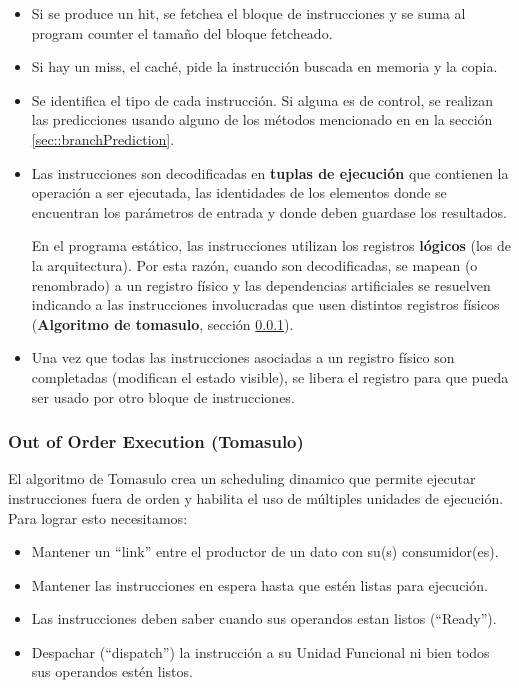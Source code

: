 \begin{itemize}
	\item Si se produce un hit, se fetchea el bloque de instrucciones y se suma al program counter el tamaño del bloque fetcheado.
	\item Si hay un miss, el caché, pide la instrucción buscada en memoria y la copia.
	\item Se identifica el tipo de cada instrucción. Si alguna es de control, se realizan las predicciones usando alguno de los métodos mencionado en en la sección \ref{sec::branchPrediction}.
	\item Las instrucciones son decodificadas en  \textbf{tuplas de ejecución} que contienen la operación a ser ejecutada, las identidades de los elementos donde se encuentran los parámetros de entrada y donde deben guardase los resultados. 
	
	En el programa estático, las instrucciones utilizan los registros \textbf{lógicos} (los de la arquitectura). Por esta razón, cuando son decodificadas, se mapean (o renombrado) a un registro físico y las dependencias artificiales se resuelven indicando a las instrucciones involucradas que usen distintos registros físicos (\textbf{Algoritmo de tomasulo}, sección \ref{ilp::tomasulo}).

	\item Una vez que todas las instrucciones asociadas a un registro físico son completadas (modifican el estado visible), se libera el registro para que pueda ser usado por otro bloque de instrucciones. 		
\end{itemize}


\subsubsection{Out of Order Execution (Tomasulo)}\label{ilp::tomasulo}
El algoritmo de Tomasulo crea un scheduling dinamico que permite ejecutar instrucciones fuera de orden y habilita el uso de múltiples unidades de ejecución. Para lograr esto necesitamos:
\begin{itemize}
	\item Mantener un ``link'' entre el productor de un dato con su(s) consumidor(es).
	\item Mantener las instrucciones en espera hasta que estén listas para ejecución.
	\item Las instrucciones deben saber cuando sus operandos estan listos (``Ready'').
	\item Despachar (``dispatch'') la instrucción a su Unidad Funcional ni bien todos sus operandos estén listos.
\end{itemize}

